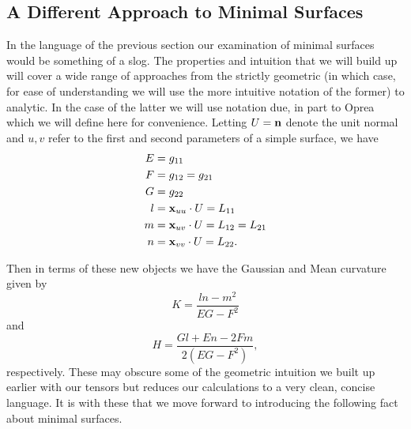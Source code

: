 \subsection{A Different Approach to Minimal Surfaces}
  \label{ss:opreaSrf}
  In the language of the previous section our examination of minimal surfaces would be something of a slog. The properties and intuition that we will build up will cover a wide range of approaches from the strictly geometric (in which case, for ease of understanding we will use the more intuitive notation of the former) to analytic. In the case of the latter we will use notation due, in part to Oprea which we will define here for convenience. Letting $U = \mathbf{n}$ denote the unit normal and $u, v$ refer to the first and second parameters of a simple surface, we have
  \begin{align*}
    E &= g_{11}\\
    F &= g_{12} = g_{21}\\
    G &= g_{22}\\
    l &= \mathbf{x}_{uu}\cdot U = L_{11}\\
    m &= \mathbf{x}_{uv}\cdot U = L_{12} = L_{21}\\
    n &= \mathbf{x}_{vv}\cdot U = L_{22}.
  \end{align*}

  Then in terms of these new objects we have the Gaussian and Mean curvature given by
  \begin{equation*}
    K = \frac{ln - m^2}{EG - F^2}
  \end{equation*}
  and
  \begin{equation}
    \label{eq:mean_curvature2}
    H = \frac{Gl + En - 2Fm}{2(EG - F^2)},
  \end{equation}
  respectively. These may obscure some of the geometric intuition we built up earlier with our tensors but reduces our calculations to a very clean, concise language. It is with these that we move forward to introducing the following fact about minimal surfaces.

